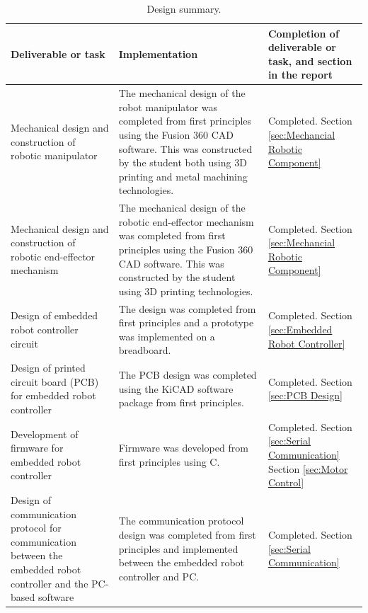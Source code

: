 \begin{table}[H]
	\renewcommand{\arraystretch}{1.3}
	\centering
	\begin{tabular}{|>{\raggedright}m{4.6cm}|>{\raggedright}m{6.6cm}|>{\raggedright\arraybackslash}m{3cm}|}
		\hline
		\textbf{Deliverable or task} & \textbf{Implementation} & \textbf{Completion of deliverable or task, and section in the report} \\
		\hline
		Mechanical design and construction of robotic manipulator & The mechanical design of the robot manipulator was completed from first principles using the Fusion 360 CAD software. This was constructed by the student both using 3D printing and metal machining technologies. & Completed. Section \ref{sec:Mechancial Robotic Component} \\
		\hline
		Mechanical design and construction of robotic end-effector mechanism & The mechanical design of the robotic end-effector mechanism was completed from first principles using the Fusion 360 CAD software. This was constructed by the student using 3D printing technologies. & Completed. Section \ref{sec:Mechancial Robotic Component} \\
		\hline
		Design of embedded robot controller circuit & The design was completed from first principles and a prototype was implemented on a breadboard. & Completed. Section \ref{sec:Embedded Robot Controller} \\
		\hline
		Design of printed circuit board (PCB) for embedded robot controller & The PCB design was completed using the KiCAD software package from first principles. & Completed. Section \ref{sec:PCB Design} \\
		\hline
		Development of firmware for embedded robot controller & Firmware was developed from first principles using C. & Completed. Section \ref{sec:Serial Communication} Section \ref{sec:Motor Control} \\
		\hline
		Design of communication protocol for communication between the embedded robot controller and the PC-based software & The communication protocol design was completed from first principles and implemented between the embedded robot controller and PC. & Completed. Section \ref{sec:Serial Communication} \\
		\hline
	\end{tabular}
	\caption{\label{tab:design_summary_p1}Design summary.}
\end{table}


